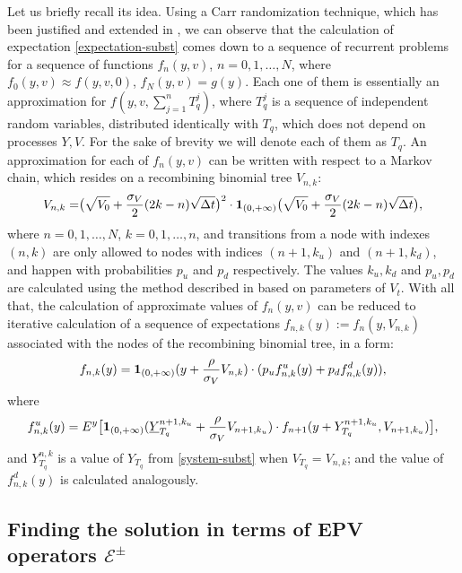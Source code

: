 \documentclass[a4paper]{jpconf}
\begin{document}
{Let us briefly recall its idea. Using a Carr randomization technique, which has been justified and extended in \cite{touzi}, we can observe that the calculation of expectation \eqref{expectation-subst} comes down to a sequence of recurrent problems for a sequence of functions $f_{n}(y, v)$, $n = 0,1,\dots,N$, where $f_{0}(y, v) \approx f(y,v,0)$, $f_{N}(y, v) = g(y)$. Each one of them is essentially an approximation for $f(y, v, \sum_{j=1}^{n} T_q^j)$, where $T_q^j$ is a sequence of independent random variables, distributed identically with $T_q$, which does not depend on processes $Y, V$. For the sake of brevity we will denote each of them as $T_q$. An approximation for each of $f_{n}(y, v)$ can be written with respect to a Markov chain, which resides on a recombining binomial tree $V_{n,k}$:
\begin{equation}{\label{tree-original}}	
V_{n,k} = \bigr{(}\sqrt{V_0} + \frac{\sigma_V}{2}(2k-n)\sqrt{\Delta t}\bigr{)}^2 \cdot {\bf 1}_{(0, +\infty)}\bigr{(}\sqrt{V_0} + \frac{\sigma_V}{2}(2k-n)\sqrt{\Delta t}\bigr{)},
\end{equation}
where $n = 0,1,\dots,N$, $k = 0,1,\dots,n$, and transitions from a node with indexes $(n,k)$ are only allowed to nodes with indices $(n+1, k_u)$ and $(n+1, k_d)$, and happen with probabilities $p_u$ and $p_d$ respectively. The values $k_u, k_d$ and $p_u, p_d$ are calculated using the method described in \cite{zanette_tree} based on parameters of $V_t$.
With all that, the calculation of approximate values of $f_{n}(y, v)$ can be reduced to iterative calculation of a sequence of expectations $f_{n,k}(y) := f_n(y, V_{n,k})$ associated with the nodes of the recombining binomial tree, in a form:
\begin{equation}\label{pupd}
f_{n,k}(y) = {\bf 1}_{(0, +\infty)} (y + \frac{\rho}{\sigma_V} V_{n,k}) \cdot(p_u f^u_{n,k}(y) + p_d f^d_{n,k}(y)),
\end{equation}
where 
\begin{equation}\label{fufd}
f^u_{n,k}(y) =  E^{y} \bigr{[}{\bf 1}_{(0, +\infty)} (\underline{Y}_{T_q}^{n+1, k_u} + \frac{\rho}{\sigma_V}V_{n+1, k_u}) \cdot f_{n+1}(y + Y_{T_q}^{n+1, k_u}, V_{n+1, k_u})\bigr{]},
\end{equation}
and ${Y}_{T_q}^{n, k}$ is a value of $Y_{T_q}$ from \eqref{system-subst} when $V_{T_q} = V_{n,k}$; and the value of $f^d_{n,k}(y)$ is calculated analogously.

\subsection{Finding the solution in terms of EPV operators $\mathcal{E}^{\pm}$}\label{factorization-section}

}
\end{document}
